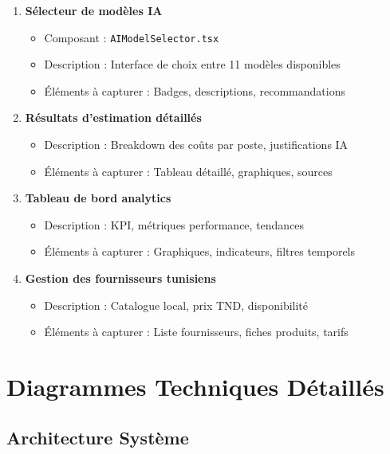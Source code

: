 \begin{enumerate}
    \item \textbf{Sélecteur de modèles IA}
    \begin{itemize}
        \item Composant : \texttt{AIModelSelector.tsx}
        \item Description : Interface de choix entre 11 modèles disponibles
        \item Éléments à capturer : Badges, descriptions, recommandations
    \end{itemize}
    
    \item \textbf{Résultats d'estimation détaillés}
    \begin{itemize}
        \item Description : Breakdown des coûts par poste, justifications IA
        \item Éléments à capturer : Tableau détaillé, graphiques, sources
    \end{itemize}
    
    \item \textbf{Tableau de bord analytics}
    \begin{itemize}
        \item Description : KPI, métriques performance, tendances
        \item Éléments à capturer : Graphiques, indicateurs, filtres temporels
    \end{itemize}
    
    \item \textbf{Gestion des fournisseurs tunisiens}
    \begin{itemize}
        \item Description : Catalogue local, prix TND, disponibilité
        \item Éléments à capturer : Liste fournisseurs, fiches produits, tarifs
    \end{itemize}
\end{enumerate}

\section{Diagrammes Techniques Détaillés}

\subsection{Architecture Système}

